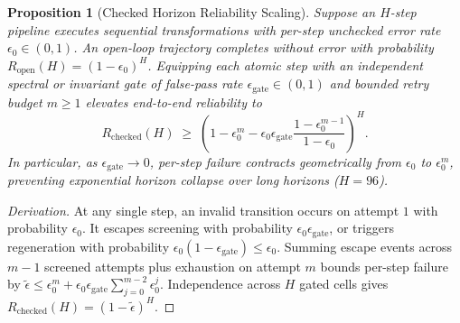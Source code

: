 \documentclass[11pt,a4paper]{article}
\newtheorem{proposition}{Proposition}
\begin{document}
\begin{proposition}[Checked Horizon Reliability Scaling]
\label{prop:horizon}
Suppose an $H$-step pipeline executes sequential transformations with per-step unchecked error rate $\epsilon_0 \in (0, 1)$. An open-loop trajectory completes without error with probability $R_{\text{open}}(H) = (1 - \epsilon_0)^H$. Equipping each atomic step with an independent spectral or invariant gate of false-pass rate $\epsilon_{\text{gate}} \in (0, 1)$ and bounded retry budget $m \ge 1$ elevates end-to-end reliability to
\begin{equation}
R_{\text{checked}}(H) \;\ge\; \left(1 - \epsilon_0^m - \epsilon_0 \epsilon_{\text{gate}} \frac{1 - \epsilon_0^{m-1}}{1 - \epsilon_0}\right)^H.
\end{equation}
In particular, as $\epsilon_{\text{gate}} \to 0$, per-step failure contracts geometrically from $\epsilon_0$ to $\epsilon_0^m$, preventing exponential horizon collapse over long horizons ($H = 96$).
\end{proposition}
\begin{proof}[Derivation]
At any single step, an invalid transition occurs on attempt $1$ with probability $\epsilon_0$. It escapes screening with probability $\epsilon_0 \epsilon_{\text{gate}}$, or triggers regeneration with probability $\epsilon_0(1-\epsilon_{\text{gate}}) \le \epsilon_0$. Summing escape events across $m-1$ screened attempts plus exhaustion on attempt $m$ bounds per-step failure by $\tilde{\epsilon} \le \epsilon_0^m + \epsilon_0 \epsilon_{\text{gate}} \sum_{j=0}^{m-2} \epsilon_0^j$. Independence across $H$ gated cells gives $R_{\text{checked}}(H) = (1 - \tilde{\epsilon})^H$.
\end{proof}
\end{document}
